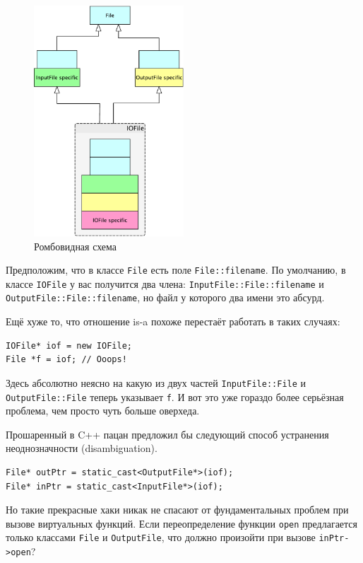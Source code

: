 \documentclass[a4paper,12pt,oneside]{article}
\begin{document}
\begin{figure}[h!]
\centering
\includegraphics[width=0.5\textwidth]{illustrations/romb-crop.pdf}
\caption{Ромбовидная схема}
\label{fig:romb-crop}
\end{figure}

Предположим, что в классе \lstinline!File! есть поле \lstinline!File::filename!. По умолчанию, в классе \lstinline!IOFile! у вас получится два члена: \lstinline!InputFile::File::filename! и \lstinline!OutputFile::File::filename!, но файл у которого два имени это абсурд. 

Ещё хуже то, что отношение is-a похоже перестаёт работать в таких случаях:

\begin{lstlisting}
IOFile* iof = new IOFile;
File *f = iof; // Ooops!
\end{lstlisting}

Здесь абсолютно неясно на какую из двух частей \lstinline!InputFile::File! и \lstinline!OutputFile::File! теперь указывает \lstinline!f!. И вот это уже гораздо более серьёзная проблема, чем просто чуть больше оверхеда.

Прошаренный в C++ пацан предложил бы следующий способ устранения неоднозначности (disambiguation).

\begin{lstlisting}
File* outPtr = static_cast<OutputFile*>(iof);
File* inPtr = static_cast<InputFile*>(iof);
\end{lstlisting}

Но такие прекрасные хаки никак не спасают от фундаментальных проблем при вызове виртуальных функций. Если переопределение функции \lstinline!open! предлагается только классами \lstinline!File! и \lstinline!OutputFile!, что должно произойти при вызове \lstinline!inPtr->open!?
\end{document}
